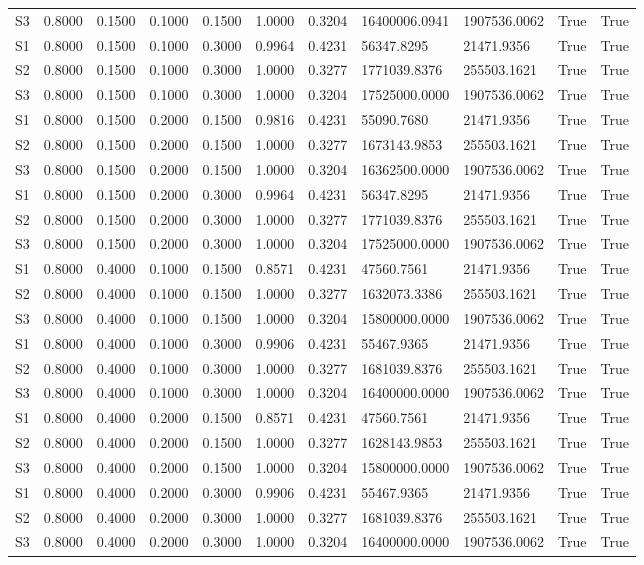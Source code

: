 \documentclass[11pt,a4paper]{article}
\begin{document}
\begin{landscape}
{\begin{longtable}{lllllllllll}
S3 & 0.8000 & 0.1500 & 0.1000 & 0.1500 & 1.0000 & 0.3204 & 16400006.0941 & 1907536.0062 & True & True \\
S1 & 0.8000 & 0.1500 & 0.1000 & 0.3000 & 0.9964 & 0.4231 & 56347.8295 & 21471.9356 & True & True \\
S2 & 0.8000 & 0.1500 & 0.1000 & 0.3000 & 1.0000 & 0.3277 & 1771039.8376 & 255503.1621 & True & True \\
S3 & 0.8000 & 0.1500 & 0.1000 & 0.3000 & 1.0000 & 0.3204 & 17525000.0000 & 1907536.0062 & True & True \\
S1 & 0.8000 & 0.1500 & 0.2000 & 0.1500 & 0.9816 & 0.4231 & 55090.7680 & 21471.9356 & True & True \\
S2 & 0.8000 & 0.1500 & 0.2000 & 0.1500 & 1.0000 & 0.3277 & 1673143.9853 & 255503.1621 & True & True \\
S3 & 0.8000 & 0.1500 & 0.2000 & 0.1500 & 1.0000 & 0.3204 & 16362500.0000 & 1907536.0062 & True & True \\
S1 & 0.8000 & 0.1500 & 0.2000 & 0.3000 & 0.9964 & 0.4231 & 56347.8295 & 21471.9356 & True & True \\
S2 & 0.8000 & 0.1500 & 0.2000 & 0.3000 & 1.0000 & 0.3277 & 1771039.8376 & 255503.1621 & True & True \\
S3 & 0.8000 & 0.1500 & 0.2000 & 0.3000 & 1.0000 & 0.3204 & 17525000.0000 & 1907536.0062 & True & True \\
S1 & 0.8000 & 0.4000 & 0.1000 & 0.1500 & 0.8571 & 0.4231 & 47560.7561 & 21471.9356 & True & True \\
S2 & 0.8000 & 0.4000 & 0.1000 & 0.1500 & 1.0000 & 0.3277 & 1632073.3386 & 255503.1621 & True & True \\
S3 & 0.8000 & 0.4000 & 0.1000 & 0.1500 & 1.0000 & 0.3204 & 15800000.0000 & 1907536.0062 & True & True \\
S1 & 0.8000 & 0.4000 & 0.1000 & 0.3000 & 0.9906 & 0.4231 & 55467.9365 & 21471.9356 & True & True \\
S2 & 0.8000 & 0.4000 & 0.1000 & 0.3000 & 1.0000 & 0.3277 & 1681039.8376 & 255503.1621 & True & True \\
S3 & 0.8000 & 0.4000 & 0.1000 & 0.3000 & 1.0000 & 0.3204 & 16400000.0000 & 1907536.0062 & True & True \\
S1 & 0.8000 & 0.4000 & 0.2000 & 0.1500 & 0.8571 & 0.4231 & 47560.7561 & 21471.9356 & True & True \\
S2 & 0.8000 & 0.4000 & 0.2000 & 0.1500 & 1.0000 & 0.3277 & 1628143.9853 & 255503.1621 & True & True \\
S3 & 0.8000 & 0.4000 & 0.2000 & 0.1500 & 1.0000 & 0.3204 & 15800000.0000 & 1907536.0062 & True & True \\
S1 & 0.8000 & 0.4000 & 0.2000 & 0.3000 & 0.9906 & 0.4231 & 55467.9365 & 21471.9356 & True & True \\
S2 & 0.8000 & 0.4000 & 0.2000 & 0.3000 & 1.0000 & 0.3277 & 1681039.8376 & 255503.1621 & True & True \\
S3 & 0.8000 & 0.4000 & 0.2000 & 0.3000 & 1.0000 & 0.3204 & 16400000.0000 & 1907536.0062 & True & True \\
\end{longtable}

}
\end{landscape}
\end{document}
